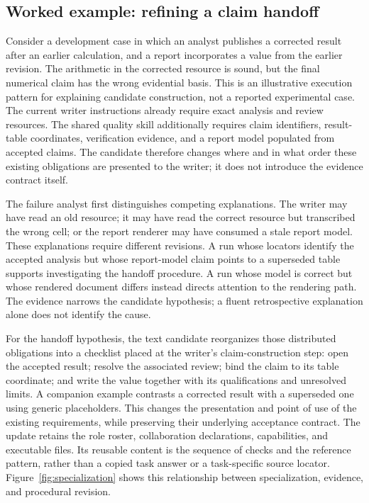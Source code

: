 \subsection{Worked example: refining a claim handoff}\label{sec:worked}
Consider a development case in which an analyst publishes a corrected result after an earlier calculation, and a report incorporates a value from the earlier revision. The arithmetic in the corrected resource is sound, but the final numerical claim has the wrong evidential basis. This is an illustrative execution pattern for explaining candidate construction, not a reported experimental case. The current writer instructions already require exact analysis and review resources. The shared quality skill additionally requires claim identifiers, result-table coordinates, verification evidence, and a report model populated from accepted claims. The candidate therefore changes where and in what order these existing obligations are presented to the writer; it does not introduce the evidence contract itself.

The failure analyst first distinguishes competing explanations. The writer may have read an old resource; it may have read the correct resource but transcribed the wrong cell; or the report renderer may have consumed a stale report model. These explanations require different revisions. A run whose locators identify the accepted analysis but whose report-model claim points to a superseded table supports investigating the handoff procedure. A run whose model is correct but whose rendered document differs instead directs attention to the rendering path. The evidence narrows the candidate hypothesis; a fluent retrospective explanation alone does not identify the cause.

For the handoff hypothesis, the text candidate reorganizes those distributed obligations into a checklist placed at the writer's claim-construction step: open the accepted result; resolve the associated review; bind the claim to its table coordinate; and write the value together with its qualifications and unresolved limits. A companion example contrasts a corrected result with a superseded one using generic placeholders. This changes the presentation and point of use of the existing requirements, while preserving their underlying acceptance contract. The update retains the role roster, collaboration declarations, capabilities, and executable files. Its reusable content is the sequence of checks and the reference pattern, rather than a copied task answer or a task-specific source locator. Figure~\ref{fig:specialization} shows this relationship between specialization, evidence, and procedural revision.

